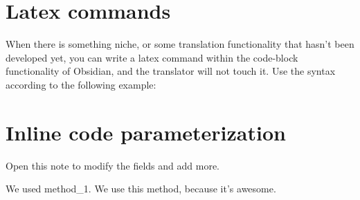 \documentclass{extarticle}
\begin{document}
\section{Latex commands}

When there is something niche, or some translation functionality that hasn't been developed yet, you can write a latex command within the code-block functionality of Obsidian, and the translator will not touch it. Use the syntax according to the following example:





\lipsum[1-4]





\section{Inline code parameterization}

Open this note to modify the fields and add more.

We used method_1. We use this method, because it's awesome. 





\appendix




\newpage
\newpage







\end{document}
